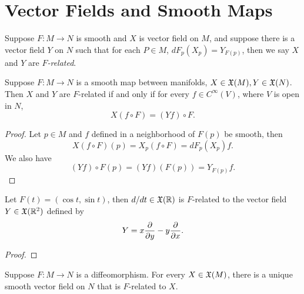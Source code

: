 \section{Vector Fields and Smooth Maps}



\begin{definition}
    Suppose $F:M \to N$ is smooth and $X$ is vector field on $M$, and suppose there is a vector field $Y$ on $N$ such that for each $P \in M$, $dF_p(X_p) = Y_{F(p)}$, then we say $X$ and $Y$ are \textit{$F$-related}.
\end{definition}

\begin{proposition}
    Suppose $F:M \to N$ is a smooth map between manifolds, $X \in \frak{X}(M) ,Y \in \frak{X}(N)$. Then $X$ and $Y$ are $F$-related if and only if for every $f \in C^\infty(V)$, where $V$ is open in $N$, 
    $$ X(f \circ F) = (Yf) \circ F. $$
\end{proposition}
\begin{proof}
    Let $p \in M$ and $f$ defined in a neighborhood of $F(p)$ be smooth, then 
    $$X(f \circ F)(p) = X_p(f \circ F) = dF_p(X_p)f. $$ We also have 
    $$(Yf) \circ F(p) = (Yf)(F(p)) = Y_{F(p)}f. $$
\end{proof}
\begin{example}
    Let $F(t) = (\cos t, \sin t)$, then $d/dt \in \frak{X}(\mathbb{R})$ is $F$-related to the vector field $Y \in \frak{X}(\mathbb{R}^2)$ defined by 
    $$Y = x\pdv{}{y} - y\pdv{}{x}. $$
\end{example}
\begin{proof}
    
\end{proof}
\begin{proposition}
    Suppose $F:M \to N$ is a diffeomorphism. For every $X \in \frak{X}(M)$, there is a unique smooth vector field on $N$ that is $F$-related to $X$. 
\end{proposition}


